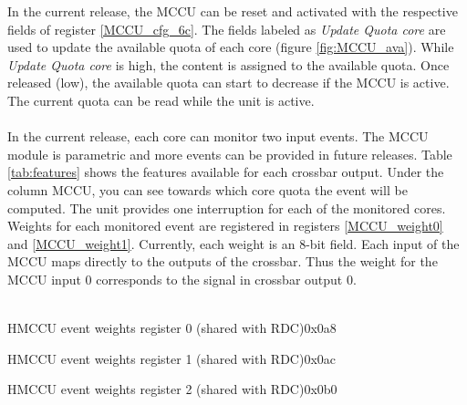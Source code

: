 In the current release, the MCCU can be reset and activated with the respective fields of register \ref{MCCU_cfg_6c}. The fields labeled as \textit{Update Quota core} are used to update the available quota of each core (figure \ref{fig:MCCU_ava}). While  \textit{Update Quota core} is high, the content is assigned to the available quota. Once released (low), the available quota can start to decrease if the MCCU is active. The current quota can be read while the unit is active.\\
\\
In the current release, each core can monitor two input events. The MCCU module is parametric and more events can be provided in future releases.  Table \ref{tab:features} shows the features available for each crossbar output. Under the column MCCU, you can see towards which core quota the event will be computed.
The unit provides one interruption for each of the monitored cores. 
\\
Weights for each monitored event are registered in registers \ref{MCCU_weight0} and \ref{MCCU_weight1}. Currently, each weight is an 8-bit field. Each input of the MCCU maps directly to the outputs of the crossbar. Thus the weight for the MCCU input 0 corresponds to the signal in crossbar output 0.\\
\\
\begin{register}{H}{MCCU event weights register 0 (shared with RDC)}{0x0a8}
	\label{MCCU_weight0}
	\regnewline
\end{register}
\begin{register}{H}{MCCU event weights register 1 (shared with RDC)}{0x0ac}
	\label{MCCU_weight1}
	\regnewline
\end{register}
\begin{register}{H}{MCCU event weights register 2 (shared with RDC)}{0x0b0}
	\label{MCCU_weight1}
	\regnewline
\end{register}

